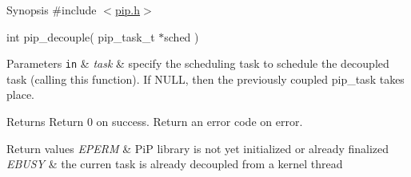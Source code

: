 \begin{DoxyParagraph}{Synopsis}
\#include $<$\hyperlink{pip_8h_source}{pip.\-h}$>$ \par
int pip\-\_\-decouple( pip\-\_\-task\-\_\-t $\ast$sched )
\end{DoxyParagraph}

\begin{DoxyParams}[1]{Parameters}
\mbox{\tt in}  & {\em task} & specify the scheduling task to schedule the decoupled task (calling this function). If {\ttfamily N\-U\-L\-L}, then the previously coupled pip\-\_\-task takes place.\\
\hline
\end{DoxyParams}
\begin{DoxyReturn}{Returns}
Return 0 on success. Return an error code on error. 
\end{DoxyReturn}

\begin{DoxyRetVals}{Return values}
{\em E\-P\-E\-R\-M} & Pi\-P library is not yet initialized or already finalized \\
\hline
{\em E\-B\-U\-S\-Y} & the curren task is already decoupled from a kernel thread \\
\hline
\end{DoxyRetVals}
